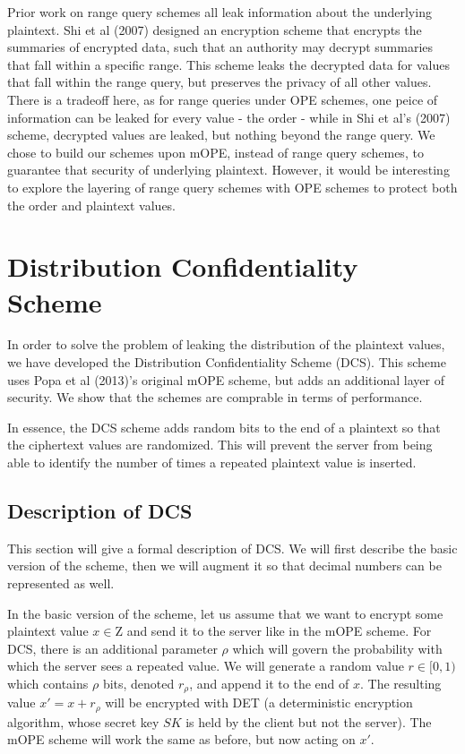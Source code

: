 \documentclass[12pt]{article}
\begin{document}
Prior work on range query schemes all leak information about the underlying plaintext. Shi et al (2007) designed an encryption scheme that encrypts the summaries of encrypted data, such that an authority may decrypt summaries that fall within a specific range. This scheme leaks the decrypted data for values that fall within the range query, but preserves the privacy of all other values. There is a tradeoff here, as for range queries under OPE schemes, one peice of information can be leaked for every value - the order - while in Shi et al's (2007) scheme, decrypted values are leaked, but nothing beyond the range query. We chose to build our schemes upon mOPE, instead of range query schemes, to guarantee that security of underlying plaintext. However, it would be interesting to explore the layering of range query schemes with OPE schemes to protect both the order and plaintext values.

\section{Distribution Confidentiality Scheme}

In order to solve the problem of leaking the distribution of the plaintext values, we have developed the Distribution Confidentiality Scheme (DCS). This scheme uses Popa et al (2013)'s original mOPE scheme, but adds an additional layer of security. We show that the schemes are comprable in terms of performance.

In essence, the DCS scheme adds random bits to the end of a plaintext so that the ciphertext values are randomized. This will prevent the server from being able to identify the number of times a repeated plaintext value is inserted.

\subsection{Description of DCS}

This section will give a formal description of DCS. We will first describe the basic version of the scheme, then we will augment it so that decimal numbers can be represented as well.

In the basic version of the scheme, let us assume that we want to encrypt some plaintext value $x \in \mathrm{Z}$ and send it to the server like in the mOPE scheme. For DCS, there is an additional parameter $\rho$ which will govern the probability with which the server sees a repeated value. We will generate a random value $r \in [0,1)$ which contains $\rho$ bits, denoted $r_{\rho}$, and append it to the end of $x$. The resulting value $x' = x + r_{\rho}$ will be encrypted with DET (a deterministic encryption algorithm, whose secret key $SK$ is held by the client but not the server). The mOPE scheme will work the same as before, but now acting on $x'$.
\end{document}
